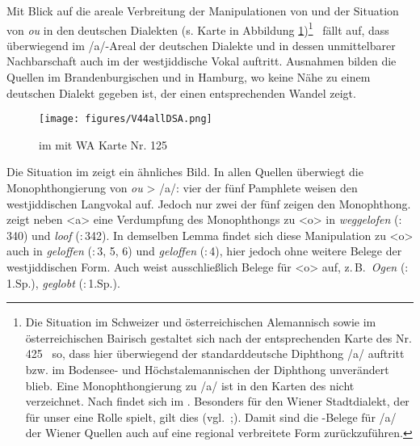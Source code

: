  Mit Blick auf die areale Verbreitung der Manipulationen von  und der Situation von {\mhd} \textit{ou} in den deutschen Dialekten (s. Karte in Abbildung \ref{karteV44DSA})\footnote{Die Situation im Schweizer und österreichischen Alemannisch sowie im österreichischen Bairisch gestaltet sich nach der entsprechenden Karte des  Nr. 425 \,%
 so, dass hier überwiegend der standarddeutsche Diphthong /a/ auftritt bzw. im Bodensee- und Höchstalemannischen der {\mhd} Diphthong unverändert blieb. Eine Monophthongierung zu  /a\textlengthmark/ ist in den Karten des  nicht verzeichnet. Nach \cite[235]{Schirmunski1962} findet sich im . Besonders für den Wiener Stadtdialekt, 
   der für unser  eine Rolle spielt, gilt dies (vgl.\, \citealt[60–63]{SchusterSchikola1956};\citealt[33]{Bacciocco1890}). Damit sind die -Belege für /a\textlengthmark/ der Wiener Quellen auch auf eine regional verbreitete Form zurückzuführen.} \,%
   fällt auf, dass überwiegend im /a\textlengthmark/-Areal der deutschen Dialekte und in dessen unmittelbarer Nachbarschaft auch im  der westjiddische Vokal auftritt. Ausnahmen bilden die Quellen im Brandenburgischen und in Hamburg, wo keine Nähe zu einem deutschen Dialekt gegeben ist, der einen entsprechenden Wandel zeigt.
 
 

 	
		\begin{figure}
		\centering
\texttt{[image: figures/V44allDSA.png]}
		\caption{\label{karteV44DSA}   im  mit WA Karte Nr. 125}
		\end{figure}

 
 Die Situation im  zeigt ein ähnliches Bild. In allen Quellen überwiegt  die Monophthongierung von {\mhd} \textit{ou} >  /a\textlengthmark/: vier der fünf Pamphlete weisen den westjiddischen Langvokal auf. Jedoch nur zwei der fünf  zeigen den Monoph\-thong.  zeigt neben <a> eine Verdumpfung des Monophthongs zu <o> in \textit{weggelofen}  (:\, 340) und \textit{loof}  (:\,342). In demselben Lemma findet sich diese Manipulation zu <o> auch in  \textit{geloffen}  (:\,3, 5, 6) und  \textit{geloffen}  (:\,4), hier jedoch ohne weitere Belege der westjiddischen Form. Auch  weist ausschließlich Belege für <o> auf, z.\,B.\,  \textit{Ogen}  (:\,1.Sp.), \textit{geglobt}  (:\,1.Sp.).


